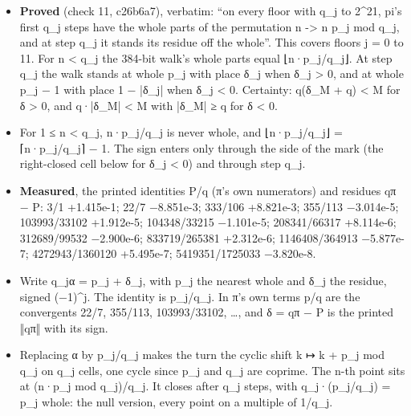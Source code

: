 \begin{itemize}
\begin{itemize}
\item \textbf{Proved} (check 11, c26b6a7), verbatim: “on every floor with q\_\allowbreak{}j to 2\textasciicircum{}21, pi's first q\_\allowbreak{}j steps have the whole parts of the permutation n -> n p\_\allowbreak{}j mod q\_\allowbreak{}j, and at step q\_\allowbreak{}j it stands its residue off the whole”. This covers floors j = 0 to 11. For n < q\_\allowbreak{}j the 384-bit walk's whole parts equal ⌊n·p\_\allowbreak{}j/q\_\allowbreak{}j⌋. At step q\_\allowbreak{}j the walk stands at whole p\_\allowbreak{}j with place δ\_\allowbreak{}j when δ\_\allowbreak{}j > 0, and at whole p\_\allowbreak{}j − 1 with place 1 − |δ\_\allowbreak{}j| when δ\_\allowbreak{}j < 0. Certainty: q(δ\_\allowbreak{}M + q) < M for δ > 0, and q·|δ\_\allowbreak{}M| < M with |δ\_\allowbreak{}M| ≥ q for δ < 0.
\item For 1 ≤ n < q\_\allowbreak{}j, n·p\_\allowbreak{}j/q\_\allowbreak{}j is never whole, and ⌊n·p\_\allowbreak{}j/q\_\allowbreak{}j⌋ = ⌈n·p\_\allowbreak{}j/q\_\allowbreak{}j⌉ − 1. The sign enters only through the side of the mark (the right-closed cell below for δ\_\allowbreak{}j < 0) and through step q\_\allowbreak{}j.
\item \textbf{Measured}, the printed identities P/q (π's own numerators) and residues qπ − P: 3/1 +1.415e-1; 22/7 −8.851e-3; 333/106 +8.821e-3; 355/113 −3.014e-5; 103993/33102 +1.912e-5; 104348/33215 −1.101e-5; 208341/66317 +8.114e-6; 312689/99532 −2.900e-6; 833719/265381 +2.312e-6; 1146408/364913 −5.877e-7; 4272943/1360120 +5.495e-7; 5419351/1725033 −3.820e-8.
\item Write q\_\allowbreak{}jα = p\_\allowbreak{}j + δ\_\allowbreak{}j, with p\_\allowbreak{}j the nearest whole and δ\_\allowbreak{}j the residue, signed (−1)\textasciicircum{}j. The identity is p\_\allowbreak{}j/q\_\allowbreak{}j. In π's own terms p/q are the convergents 22/7, 355/113, 103993/33102, …, and δ = qπ − P is the printed ‖qπ‖ with its sign.
\item Replacing α by p\_\allowbreak{}j/q\_\allowbreak{}j makes the turn the cyclic shift k ↦ k + p\_\allowbreak{}j mod q\_\allowbreak{}j on q\_\allowbreak{}j cells, one cycle since p\_\allowbreak{}j and q\_\allowbreak{}j are coprime. The n-th point sits at (n·p\_\allowbreak{}j mod q\_\allowbreak{}j)/q\_\allowbreak{}j. It closes after q\_\allowbreak{}j steps, with q\_\allowbreak{}j·(p\_\allowbreak{}j/q\_\allowbreak{}j) = p\_\allowbreak{}j whole: the null version, every point on a multiple of 1/q\_\allowbreak{}j.

\end{itemize}
\end{itemize}
